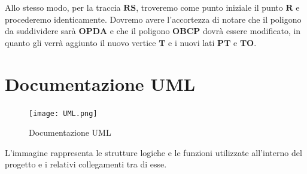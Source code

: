 \documentclass[a4paper]{article}
\newcommand{\B}{\mathbf}
\begin{document}
Allo stesso modo, per la traccia $\B{RS}$, troveremo come punto iniziale il punto $\B{R}$ e procederemo identicamente. Dovremo avere l'accortezza di notare che il poligono da suddividere sarà $\B{OPDA}$ e che il poligono $\B{OBCP}$ dovrà essere modificato, in quanto gli verrà aggiunto il nuovo vertice $\B T$ e i nuovi lati $\B{PT}$ e $\B{TO}$.

\section{Documentazione UML}

\begin{figure}[h]
    \centering
    \texttt{[image: UML.png]}
    \caption{Documentazione UML}
    \label{fig:DocUML}
\end{figure}

L'immagine rappresenta le strutture logiche e le funzioni utilizzate all'interno del progetto e i relativi collegamenti tra di esse.
\end{document}
